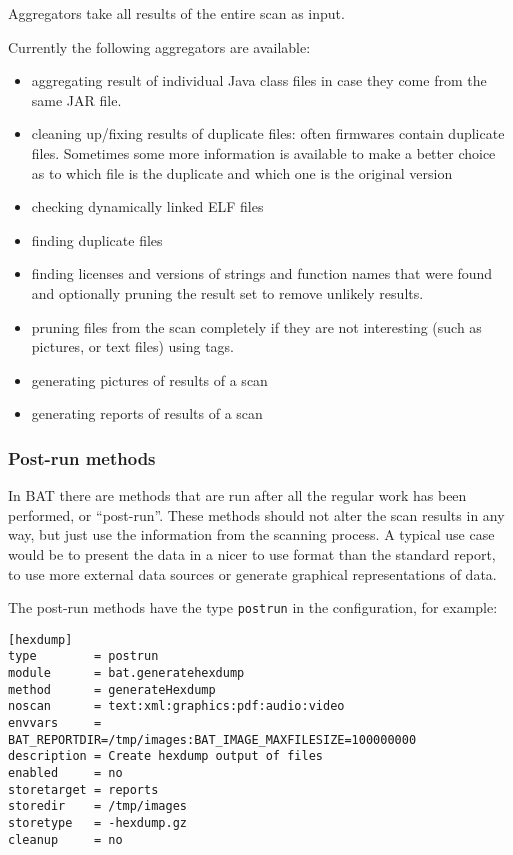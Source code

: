 \documentclass[10pt]{article}
\begin{document}
Aggregators take all results of the entire scan as input.

Currently the following aggregators are available:

\begin{itemize}
\item aggregating result of individual Java class files in case they come from
the same JAR file.
\item cleaning up/fixing results of duplicate files: often firmwares contain
duplicate files. Sometimes some more information is available to make a better
choice as to which file is the duplicate and which one is the original version
\item checking dynamically linked ELF files
\item finding duplicate files
\item finding licenses and versions of strings and function names that were
found and optionally pruning the result set to remove unlikely results.
\item pruning files from the scan completely if they are not interesting (such
as pictures, or text files) using tags.
\item generating pictures of results of a scan
\item generating reports of results of a scan
\end{itemize}

\subsubsection{Post-run methods}

In BAT there are methods that are run after all the regular work has been
performed, or ``post-run''. These methods should not alter the scan results in
any way, but just use the information from the scanning process. A typical use
case would be to present the data in a nicer to use format than the standard
report, to use more external data sources or generate graphical representations
of data.

The post-run methods have the type \texttt{postrun} in the configuration, for
example:

\begin{verbatim}
[hexdump]
type        = postrun
module      = bat.generatehexdump
method      = generateHexdump
noscan      = text:xml:graphics:pdf:audio:video
envvars     = BAT_REPORTDIR=/tmp/images:BAT_IMAGE_MAXFILESIZE=100000000
description = Create hexdump output of files
enabled     = no
storetarget = reports
storedir    = /tmp/images
storetype   = -hexdump.gz
cleanup     = no
\end{verbatim}
\end{document}
